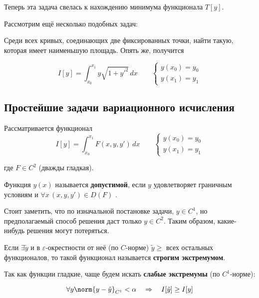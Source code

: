 	Теперь эта задача свелась к нахождению минимума функционала $T[y]$.
	
	Рассмотрим ещё несколько подобных задач:
	
	
	Среди всех кривых, соединающих две фиксированных точки, найти такую, которая имеет наименьшую площадь. Опять же, получится
	
	$$I[y] = \int_{x_0}^{x_1} y\sqrt{1 + y'^2}\,dx \qquad \left\{
	\begin{aligned}
		y(x_0) = y_0 \\
		y(x_1) = y_1
	\end{aligned}
	\right.$$
	
	\subsection{Простейшие задачи вариационного исчисления}
	
	Рассматривается функционал 
	$$I[y] = \int_{x_0}^{x_1} F(x,y,y') \,dx \qquad \left\{
	\begin{aligned}
		y(x_0) = y_0 \\
		y(x_1) = y_1
	\end{aligned}
	\right.$$
	
	где $F\in C^2$ (дважды гладкая).
	
	\begin{defi}
		Функция $y(x)$ называется \textbf{допустимой}, если $y$
		удовлетворяет граничным условиям и $\forall x\, (x, y, y')\in D(F)$ .
	\end{defi}
	
	Стоит заметить, что по изначальной постановке задачи, $y \in C^1$, но предполагаемый способ решения
	даст только $y \in C^2$. Таким образом, какие-нибудь решения могут потеряться. 
	
	Если $\exists \tilde{y}$ и в $\varepsilon$-окрестности от неё (по $C$-норме) $\tilde{y} \geq$ всех 
	остальных функционалов, то такой функционал называется \textbf{строгим экстремумом}.
	
	Так как функции гладкие, чаще будем искать \textbf{слабые экстремумы} (по $C^1$-норме):
	
	$$\forall y \norm{y - \tilde{y}}_{C^1} < \alpha \quad\Rightarrow\quad I[\tilde{y}] \geq I[y]$$